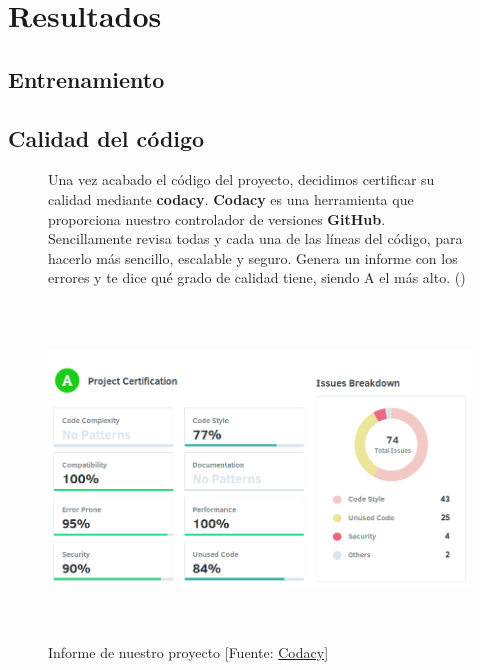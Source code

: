 \cleardoublepage

\chapter{Resultados}
\label{makereference6}

\section{Entrenamiento}
\label{makereference6.1}

\section{Calidad del código}
\label{makereference6.2}

\begin{figure}[htb]
	Una vez acabado el código del proyecto, decidimos certificar su calidad mediante \textbf{codacy}.
	\textbf{Codacy} es una herramienta que proporciona nuestro controlador de versiones \textbf{GitHub}. Sencillamente revisa todas y cada una de las líneas del código, para hacerlo más sencillo, escalable y seguro. Genera un informe con los errores y te dice qué grado de calidad tiene, siendo A el más alto. (\cite{ARP:Codacy:2017})
	
	\begin{center}
		\includegraphics[height=3.5in]{figures/codacy.png}
		\caption{Informe de nuestro proyecto [Fuente: \href{https://www.codacy.com}{Codacy}]}
	\end{center}
	
	\label{codacy}
\end{figure}